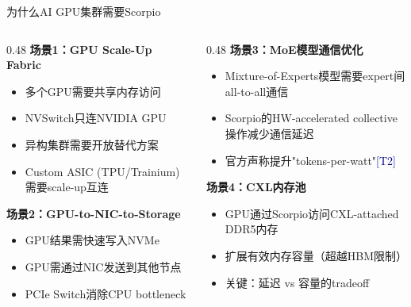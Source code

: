 \documentclass[UTF8,11pt,aspectratio=169]{beamer}
\newcommand{\sourceT}[1]{{\small\textcolor{darkblue}{[T#1]}}}
\begin{document}
\begin{frame}{为什么AI GPU集群需要Scorpio}
    \begin{columns}[T]
        \begin{column}{0.48\textwidth}
            \textbf{场景1：GPU Scale-Up Fabric}
            \begin{itemize}
                \item 多个GPU需要共享内存访问
                \item NVSwitch只连NVIDIA GPU
                \item 异构集群需要开放替代方案
                \item Custom ASIC (TPU/Trainium)需要scale-up互连
            \end{itemize}
            \vspace{0.3cm}
            \textbf{场景2：GPU-to-NIC-to-Storage}
            \begin{itemize}
                \item GPU结果需快速写入NVMe
                \item GPU需通过NIC发送到其他节点
                \item PCIe Switch消除CPU bottleneck
            \end{itemize}
        \end{column}
        \begin{column}{0.48\textwidth}
            \textbf{场景3：MoE模型通信优化}
            \begin{itemize}
                \item Mixture-of-Experts模型需要expert间all-to-all通信
                \item Scorpio的HW-accelerated collective操作减少通信延迟
                \item 官方声称提升"tokens-per-watt"\sourceT{2}
            \end{itemize}
            \vspace{0.3cm}
            \textbf{场景4：CXL内存池}
            \begin{itemize}
                \item GPU通过Scorpio访问CXL-attached DDR5内存
                \item 扩展有效内存容量（超越HBM限制）
                \item 关键：延迟 vs 容量的tradeoff
            \end{itemize}
        \end{column}
    \end{columns}
\end{frame}
\end{document}
